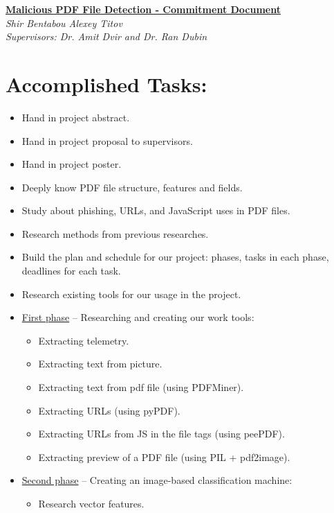 \documentclass[10pt, a4paper]{article}
\begin{document}
\renewcommand{\thepage}{\arabic{page}}%
\pagecolor{yellow!20}
\begingroup  
  \centering
  \large \underline{\textbf{Malicious PDF File Detection - Commitment Document}}\\
  \bigbreak  
  \large \textit{Shir Bentabou \qquad Alexey Titov}\\ 
  \bigbreak 
  \large \textit{Supervisors: Dr. Amit Dvir and Dr. Ran Dubin}\\
\endgroup
\section{\large Accomplished Tasks:}
\begin{itemize}
\item Hand in project abstract.
\item Hand in project proposal to supervisors.
\item Hand in project poster.
\item Deeply know PDF file structure, features and fields.
\item Study about phishing, URLs, and JavaScript uses in PDF files.
\item Research methods from previous researches.
\item Build the plan and schedule for our project: phases, tasks in each phase, deadlines for each task.
\item Research existing tools for our usage in the project.
\item \underline{First phase} – Researching and creating our work tools:
	\begin{itemize}
	\item Extracting telemetry.
	\item Extracting text from picture.
	\item Extracting text from pdf file (using PDFMiner).
	\item Extracting URLs (using pyPDF).
	\item Extracting URLs from JS in the file tags (using peePDF).
	\item Extracting preview of a PDF file (using PIL + pdf2image).
	\end{itemize}
\item \underline{Second phase} – Creating an image-based classification machine:
	\begin{itemize}
	\item Research vector features.

\end{itemize}
\end{itemize}
\end{document}
